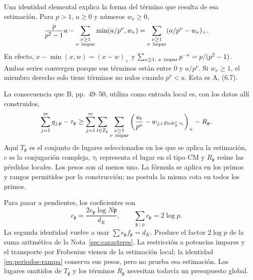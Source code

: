 Una identidad elemental explica la forma del término que resulta de
esa estimación. Para $p>1$, $a\ge0$ y números $w_\nu\ge0$,
\begin{equation}
 \frac{p}{p^2-1}a-
       \sum_{\substack{\nu\ge1\\\nu\ {\rm impar}}}
                   \min(a/p^\nu,w_\nu)
 =\sum_{\substack{\nu\ge1\\\nu\ {\rm impar}}}
                   (a/p^\nu-w_\nu)_+.
 \label{eq:periodos-rampa}
\end{equation}
En efecto, $x-\min(x,w)=(x-w)_+$ y
$\sum_{\nu\ge1,\ \nu\ {\rm impar}}p^{-\nu}=p/(p^2-1)$.
Ambas series convergen porque sus términos están entre $0$ y
$a/p^\nu$. Si $w_\nu\ge1$, el miembro derecho solo tiene términos
no nulos cuando $p^\nu<a$. Esta es A, (6.7).

La consecuencia que B, pp.~49--50, utiliza como entrada local es,
con los datos allí construidos,
\begin{equation}
 \sum_{j=1}^m g_{j,\mathfrak p}-\tau_\mathfrak p
 \ge\sum_{j=1}^m\sum_{t\in T_\mathfrak p}
       \sum_{\substack{\nu\ge1\\\nu\ {\rm impar}}}
       \left(\frac{a_t}{p^\nu}
                   -w_{j,c\operatorname{Frob}_p^\nu\tau_t}\right)_+
       -R_\mathfrak p .
 \label{eq:periodos-entrada-local}
\end{equation}
Aquí $T_\mathfrak p$ es el conjunto de lugares seleccionados en los
que se aplica la estimación, $c$ es la conjugación compleja,
$\tau_t$ representa el lugar en el tipo CM y $R_\mathfrak p$ reúne
las pérdidas locales. Los pesos son al menos uno. La fórmula se
aplica en los primos y rangos permitidos por la construcción; no
postula la misma cota en todos los primos.

Para pasar a pendientes, los coeficientes son
\begin{equation}
 c_\mathfrak p=\frac{2e_\mathfrak p\log N\mathfrak p}{d_K},
 \qquad
 \sum_{\mathfrak p\mid p}c_\mathfrak p=2\log p.
 \label{eq:periodos-peso-local}
\end{equation}
La segunda identidad vuelve a usar $\sum e_\mathfrak p
f_\mathfrak p=d_K$. Produce el factor $2\log p$ de la suma
aritmética de la Nota~\ref{sec:caracteres}. La restricción a potencias
impares y el transporte por Frobenius vienen de la estimación local;
la identidad \eqref{eq:periodos-rampa} conserva sus pesos, pero no
prueba esa estimación. Los lugares omitidos de $T_\mathfrak p$ y
los términos $R_\mathfrak p$ necesitan todavía un presupuesto global.

